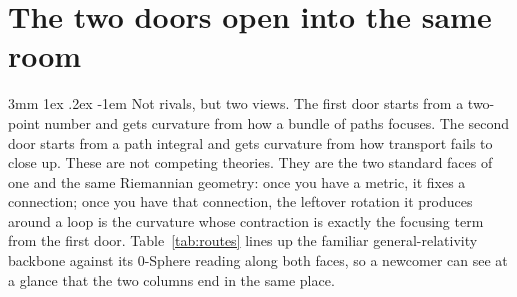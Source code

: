 \documentclass[%
 reprint, amsmath,amssymb, aps, prb, ]{revtex4-2}
\makeatletter
\numberwithin{equation}{section}
\renewcommand\paragraph{%
  \@startsection{paragraph}{4}{\z@}%
    {3mm \@plus 1ex \@minus .2ex}%
    {-1em}%
    {\normalfont\normalsize\itshape}}
\makeatother
\begin{document}
\section{The two doors open into the same room}
\label{sec:reconcile}

\paragraph{Not rivals, but two views.}
The first door starts from a two-point number and gets curvature from how a bundle of paths focuses. The second door starts from a path integral and gets curvature from how transport fails to close up. These are not competing theories. They are the two standard faces of one and the same Riemannian geometry: once you have a metric, it fixes a connection; once you have that connection, the leftover rotation it produces around a loop is the curvature whose contraction is exactly the focusing term from the first door. Table~\ref{tab:routes} lines up the familiar general-relativity backbone against its 0-Sphere reading along both faces, so a newcomer can see at a glance that the two columns end in the same place.
\end{document}
